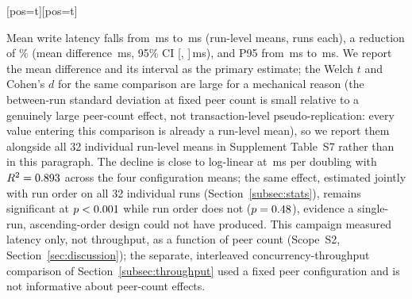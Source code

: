 \documentclass[a4paper,fleqn]{cas-dc}
\makeatletter
\newenvironment{widefig}[1][pos=t]
  {\ifdoublecol \@nameuse{figure*}[#1]\else \@nameuse{figure}[#1]\fi}
  {\ifdoublecol \@nameuse{endfigure*}\else \@nameuse{endfigure}\fi}
\makeatother
\begin{document}
\begin{widefig}
\centering
{}
\caption{Run-level write latency and 95\% confidence intervals by configured logical peer count.}
\label{fig:scaling}
\end{widefig}

Mean write latency falls from \ScaleMinPeerMean\,ms to \ScaleMaxPeerMean\,ms
(run-level means, \PartRunsPerConfig{} runs each), a reduction of
\ScaleLatencyDropPct\% (mean difference \ScaleDiffMs\,ms, 95\% CI
[\ScaleDiffCILow, \ScaleDiffCIHigh]\,ms), and P95 from
\ScaleMinPeerPNinetyFive\,ms to \ScaleMaxPeerPNinetyFive\,ms. We report the
mean difference and its interval as the primary estimate; the Welch $t$
and Cohen's $d$ for the same comparison are large for a mechanical reason
(the between-run standard deviation at fixed peer count is small relative
to a genuinely large peer-count effect, not transaction-level
pseudo-replication: every value entering this comparison is already a
run-level mean), so we report them alongside all 32 individual run-level
means in Supplement Table~S7 rather than in this paragraph. The decline is
close to
log-linear at \ScaleSlope\,ms per doubling with $R^2 = 0.893$
across the four configuration means; the same effect, estimated jointly
with run order on all 32 individual runs (Section~\ref{subsec:stats}),
remains significant at $p<0.001$ while run order does not
($p=0.48$), evidence a single-run, ascending-order design
could not have produced. This campaign measured latency only, not
throughput, as a function of peer count (Scope~S2,
Section~\ref{sec:discussion}); the separate, interleaved
concurrency-throughput comparison of Section~\ref{subsec:throughput} used
a fixed peer configuration and is not informative about peer-count
effects.
\end{document}
